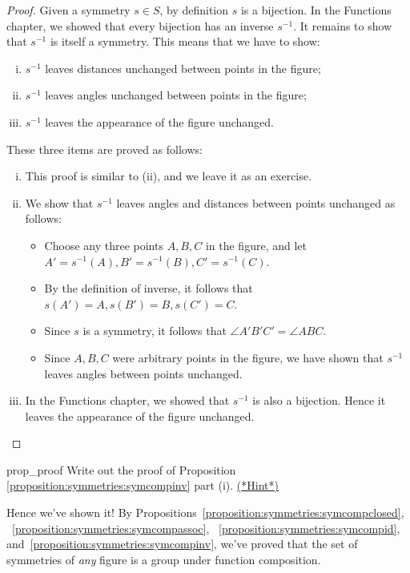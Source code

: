 \begin{proof}
Given a symmetry $s \in S$, by definition $s$ is a bijection.  In the Functions chapter, we showed that every bijection has an inverse $s^{-1}$. It remains to show that $s^{-1}$ is itself a symmetry. This means that we have to show: 

\begin{enumerate}[(i)]
\item
 $s^{-1}$ leaves distances unchanged between points in the figure;  
\item
$s^{-1}$ leaves angles unchanged between points in the figure; 
\item
$s^{-1}$ leaves the appearance of the figure unchanged.  
\end{enumerate}

\noindent  These three items are proved as follows:

\begin{enumerate}[(i)]
\item
This proof is similar to (ii), and we leave it as an exercise.
\item
We show that $s^{-1}$ leaves angles and distances between points unchanged as follows:
\begin{itemize}
\item
 Choose any three points $A, B, C$ in the figure, and let $A'=s^{-1}(A), B'=s^{-1}(B),  C'=s^{-1}(C)$. 
\item
By the definition of inverse, it follows that 
$s(A')=A, s(B')=B, s(C')=C$. 
\item
Since $s$ is a symmetry, it follows that $\angle A'B'C' =\angle ABC$.  
\item
Since $A,B, C$ were arbitrary points in the figure, we have shown 
that $s^{-1}$ leaves angles between points unchanged.
\end{itemize}
\item In the Functions chapter, we showed that $s^{-1}$ is also a bijection. Hence it leaves the appearance of the figure unchanged.
\end{enumerate} 
\end{proof}

\begin{exercise}{prop_proof}
Write out the proof of Proposition \ref{proposition:symmetries:symcompinv} part (i).
\hyperref[sec:symmetries:hints]{(*Hint*)}
\end{exercise}

\bigskip
Hence we've shown it!  By Propositions~\ref{proposition:symmetries:symcompclosed}, ~\ref{proposition:symmetries:symcompassoc}, ~\ref{proposition:symmetries:symcompid}, and~\ref{proposition:symmetries:symcompinv}, we've proved that the set of symmetries of \emph{any} figure is a group under function composition.

